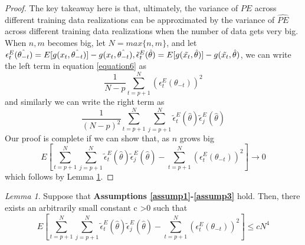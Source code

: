 \documentclass[12pt, oneside]{amsart}
\theoremstyle{definition}
\theoremstyle{remark}
\numberwithin{equation}{section}
\begin{document}
\begin{proof}
The key takeaway here is that, ultimately, the variance of $PE$ across different training data realizations can be approximated by the variance of $\hat{PE}$ across different training data realizations when the number of data gets very big. When $n, m$ becomes big, let $N = max \{n, m\}$, and let $\epsilon^E_t(\hat{\theta_{-t}}) = E[g(x_t, \hat{\theta_{-t}})] - g(x_t,\hat{\theta_{-t}}), \tilde{\epsilon}^E_t(
\hat{\theta}
) = E[g(\Tilde{x_t}, \hat{\theta})] - g(\Tilde{x_t},\hat{\theta})$, we can write the left term in equation \ref{equation6} as
$$  \frac{1}{N-p} \sum_{t=p+1}^N  \left( \epsilon^E_t(\theta_{-t}) \right)^2$$and similarly we can write the right term as $$  \frac{1}{(N-p)^2} \sum_{t=p+1}^N \sum_{j=p+1}^N  \tilde{\epsilon}^E_t(\hat{\theta}) \tilde{\epsilon}^E_j(\hat{\theta})$$
Our proof is complete if we can show that, as $n$ grows big
$$E\left[ \sum_{t=p+1}^N \sum_{j=p+1}^N  \tilde{\epsilon}^E_t(\hat{\theta}) \tilde{\epsilon}^E_j(\hat{\theta}) - \sum_{t=p+1}^N  \left( \epsilon^E_t(\theta_{-t}) \right)^2 \right] \rightarrow 0 $$ 
which follows by Lemma \ref{lemma1}. 
\end{proof}

\newtheorem{lemma}{Lemma}
\begin{lemma}\label{lemma1}
    Suppose that \textbf{Assumptions \ref{assump1}-\ref{assump3}} hold. Then, there exists an arbitrarily small constant c \textgreater 0 such that $$E \left[  \sum_{t=p+1}^N \sum_{j=p+1}^N   \tilde{\epsilon}^E_t(\hat{\theta}) \tilde{\epsilon}^E_j(\hat{\theta}) - \sum_{t=p+1}^N  \left( \epsilon^E_t(\theta_{-t}) \right)^2 \right] \leq cN^4$$
\end{lemma}
\end{document}
